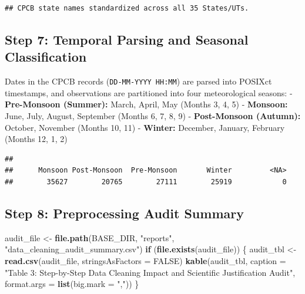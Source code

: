 \documentclass[
]{article}
\newenvironment{Shaded}{\begin{snugshade}}{\end{snugshade}}
\newcommand{\AttributeTok}[1]{\textcolor[rgb]{0.13,0.29,0.53}{#1}}
\newcommand{\ConstantTok}[1]{\textcolor[rgb]{0.56,0.35,0.01}{#1}}
\newcommand{\ControlFlowTok}[1]{\textcolor[rgb]{0.13,0.29,0.53}{\textbf{#1}}}
\newcommand{\FunctionTok}[1]{\textcolor[rgb]{0.13,0.29,0.53}{\textbf{#1}}}
\newcommand{\NormalTok}[1]{#1}
\newcommand{\OtherTok}[1]{\textcolor[rgb]{0.56,0.35,0.01}{#1}}
\newcommand{\SpecialCharTok}[1]{\textcolor[rgb]{0.81,0.36,0.00}{\textbf{#1}}}
\newcommand{\StringTok}[1]{\textcolor[rgb]{0.31,0.60,0.02}{#1}}
\begin{document}
\begin{verbatim}
## CPCB state names standardized across all 35 States/UTs.
\end{verbatim}

\subsection{Step 7: Temporal Parsing and Seasonal
Classification}\label{step-7-temporal-parsing-and-seasonal-classification}

Dates in the CPCB records (\texttt{DD-MM-YYYY\ HH:MM}) are parsed into
POSIXct timestamps, and observations are partitioned into four
meteorological seasons: - \textbf{Pre-Monsoon (Summer):} March, April,
May (Months 3, 4, 5) - \textbf{Monsoon:} June, July, August, September
(Months 6, 7, 8, 9) - \textbf{Post-Monsoon (Autumn):} October, November
(Months 10, 11) - \textbf{Winter:} December, January, February (Months
12, 1, 2)

\begin{Shaded}
\end{Shaded}

\begin{verbatim}
## 
##      Monsoon Post-Monsoon  Pre-Monsoon       Winter         <NA> 
##        35627        20765        27111        25919            0
\end{verbatim}

\subsection{Step 8: Preprocessing Audit
Summary}\label{step-8-preprocessing-audit-summary}

\begin{Shaded}
\begin{Highlighting}[]
\NormalTok{audit\_file }\OtherTok{\textless{}{-}} \FunctionTok{file.path}\NormalTok{(BASE\_DIR, }\StringTok{"reports"}\NormalTok{, }\StringTok{"data\_cleaning\_audit\_summary.csv"}\NormalTok{)}
\ControlFlowTok{if}\NormalTok{ (}\FunctionTok{file.exists}\NormalTok{(audit\_file)) \{}
\NormalTok{  audit\_tbl }\OtherTok{\textless{}{-}} \FunctionTok{read.csv}\NormalTok{(audit\_file, }\AttributeTok{stringsAsFactors =} \ConstantTok{FALSE}\NormalTok{)}
  \FunctionTok{kable}\NormalTok{(audit\_tbl, }\AttributeTok{caption =} \StringTok{"Table 3: Step{-}by{-}Step Data Cleaning Impact and Scientific Justification Audit"}\NormalTok{,}
        \AttributeTok{format.args =} \FunctionTok{list}\NormalTok{(}\AttributeTok{big.mark =} \StringTok{","}\NormalTok{))}
\NormalTok{\}}
\end{Highlighting}
\end{Shaded}
\end{document}
